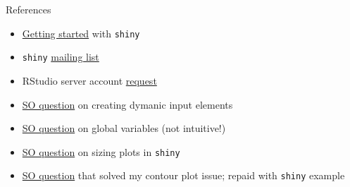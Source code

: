 \documentclass[sans,aspectratio=169,presentation,bigger,fleqn]{beamer}
\begin{document}
\begin{frame}[fragile,label=sec-29]{References}
 \begin{itemize}
\item \href{http://shiny.rstudio.com/tutorial/}{Getting started} with \texttt{shiny}
\item \texttt{shiny} \href{https://groups.google.com/forum/#!forum/shiny-discuss}{mailing list}
\item RStudio server account \href{https://shinyapps.io/}{request}
\item \href{http://stackoverflow.com/questions/19130455/create-dynamic-number-of-input-elements-with-r-shiny}{SO question} on creating dymanic input elements
\item \href{http://stackoverflow.com/questions/17683933/set-global-object-in-shiny}{SO question} on global variables (not intuitive!)
\item \href{http://stackoverflow.com/questions/17838709/scale-and-size-of-plot-in-rstudio-shiny}{SO question} on sizing plots in \texttt{shiny}
\item \href{http://stackoverflow.com/questions/17958730/faceting-a-set-of-contour-plots-in-ggplot-r}{SO question} that solved my contour plot issue; repaid with \texttt{shiny} example
\end{itemize}
\end{frame}
\end{document}
